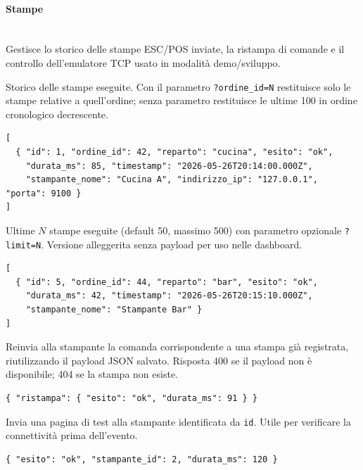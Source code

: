 \paragraph{Stampe}\mbox{}\\

Gestisce lo storico delle stampe ESC/POS inviate, la ristampa di comande e il
controllo dell'emulatore TCP usato in modalità demo/sviluppo.


Storico delle stampe eseguite. Con il parametro \texttt{?ordine\_id=N} restituisce
solo le stampe relative a quell'ordine; senza parametro restituisce le ultime 100 in
ordine cronologico decrescente.

\begin{lstlisting}[style=json]
[
  { "id": 1, "ordine_id": 42, "reparto": "cucina", "esito": "ok",
    "durata_ms": 85, "timestamp": "2026-05-26T20:14:00.000Z",
    "stampante_nome": "Cucina A", "indirizzo_ip": "127.0.0.1", "porta": 9100 }
]
\end{lstlisting}


Ultime $N$ stampe eseguite (default 50, massimo 500) con parametro opzionale
\texttt{?limit=N}. Versione alleggerita senza payload per uso nelle dashboard.

\begin{lstlisting}[style=json]
[
  { "id": 5, "ordine_id": 44, "reparto": "bar", "esito": "ok",
    "durata_ms": 42, "timestamp": "2026-05-26T20:15:10.000Z",
    "stampante_nome": "Stampante Bar" }
]
\end{lstlisting}


Reinvia alla stampante la comanda corrispondente a una stampa già registrata,
riutilizzando il payload JSON salvato. Risposta 400 se il payload non è disponibile;
404 se la stampa non esiste.

\begin{lstlisting}[style=json]
{ "ristampa": { "esito": "ok", "durata_ms": 91 } }
\end{lstlisting}


Invia una pagina di test alla stampante identificata da \texttt{id}. Utile per
verificare la connettività prima dell'evento.

\begin{lstlisting}[style=json]
{ "esito": "ok", "stampante_id": 2, "durata_ms": 120 }
\end{lstlisting}

